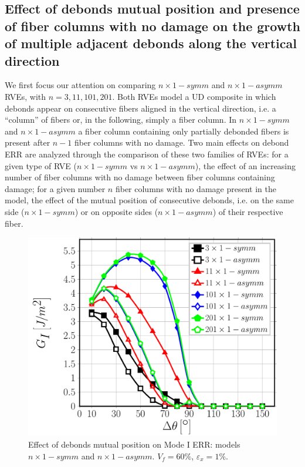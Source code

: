 \documentclass[smallextended]{svjour3}       %
\begin{document}
\subsection{Effect of debonds mutual position and presence of  fiber columns with no damage on the growth of multiple adjacent debonds along the vertical direction}\label{subsec:adjacentdebonds}

We first focus our attention on comparing $n\times 1-symm$ and $n\times 1-asymm$ RVEs, with $n=3,11,101,201$. Both RVEs model a UD composite in which debonds appear on consecutive fibers aligned in the vertical direction, i.e. a ``column'' of fibers or, in the following, simply a fiber column. In $n\times 1-symm$ and $n\times 1-asymm$ a fiber column containing only partially debonded fibers is present after $n-1$ fiber columns with no damage. Two main effects on debond ERR are analyzed through the comparison of these two families of RVEs: for a given type of RVE ($n\times 1-symm$ vs $n\times 1-asymm$), the effect of an increasing number of fiber columns with no damage between fiber columns containing damage; for a given number $n$ fiber columns with no damage present in the model, the effect of the mutual position of consecutive debonds, i.e. on the same side ($n\times 1-symm$) or on opposite sides ($n\times 1-asymm$) of their respective fiber.

\begin{figure}[!h]
\centering
\includegraphics[width=\textwidth]{nx1-coupling-vf60-GI.pdf}
\caption{Effect of debonds mutual position on Mode I ERR: models $n\times 1-symm$ and $n\times 1-asymm$. $V_{f}=60\%$, $\varepsilon_{x}=1\%$.}\label{fig:nx1GI}
\end{figure}
\end{document}
